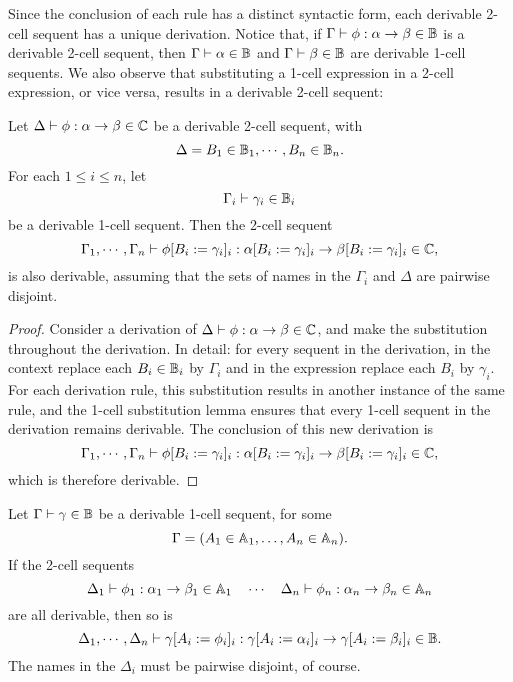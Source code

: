 \documentclass{robinthesisdraft}
\begin{document}
Since the conclusion of each rule has a distinct syntactic form, each derivable
2-cell sequent has a unique derivation.
Notice that, if $\Gamma\vdash \phi:\alpha\to\beta\in\mathbb{B}$ is a derivable
2-cell sequent, then $\Gamma\vdash\alpha\in\mathbb{B}$ and $\Gamma\vdash\beta\in\mathbb{B}$
are derivable 1-cell sequents.
%
We also observe that substituting a 1-cell expression in a 2-cell expression,
or vice versa, results in a derivable 2-cell sequent:
\begin{lemma}[1-in-2 substitution]\label{lemma-1in2}
	Let \( \Delta \vdash \phi:\alpha\to\beta \in\mathbb{C} \)
	be a derivable 2-cell sequent, with
	\[
		\Delta = B_{1}\in\mathbb{B}_{1}, \cdots, B_{n}\in\mathbb{B}_{n}.
	\]
	For each $1\leq i\leq n$, let
	\[
		\Gamma_{i} \vdash \gamma_{i}\in\mathbb{B}_{i}
	\]
	be a derivable 1-cell sequent. Then the 2-cell sequent
	\[ \Gamma_{1}, \cdots, \Gamma_{n}
		\vdash \phi[B_{i}:=\gamma_{i}]_{i}
		: \alpha[B_{i}:=\gamma_{i}]_{i}\to\beta[B_{i}:=\gamma_{i}]_{i}
		\in \mathbb{C}, \]
	is also derivable,
	assuming that the sets of names in the $\Gamma_{i}$ and $\Delta$
	are pairwise disjoint.
\end{lemma}
\begin{proof}
	Consider a derivation of \( \Delta \vdash \phi:\alpha\to\beta \in\mathbb{C} \),
	and make the substitution throughout the derivation. In detail: for
	every sequent in the derivation, in the context replace each $B_{i}\in\mathbb{B}_{i}$
	by $\Gamma_{i}$ and in the expression replace each $B_{i}$ by $\gamma_{i}$.
	For each derivation rule, this
	substitution results in another instance of the same rule, and the
	1-cell substitution lemma ensures that every 1-cell sequent in the
	derivation remains derivable. The conclusion of this new derivation
	is
	\[ \Gamma_{1}, \cdots, \Gamma_{n}
		\vdash \phi[B_{i}:=\gamma_{i}]_{i}
		: \alpha[B_{i}:=\gamma_{i}]_{i}\to\beta[B_{i}:=\gamma_{i}]_{i}
		\in \mathbb{C}, \]
	which is therefore derivable.
\end{proof}
\begin{lemma}[2-in-1 substitution]\label{lemma-2in1}
	Let $\Gamma\vdash\gamma\in\mathbb{B}$ be a derivable 1-cell sequent, for
	some \[ \Gamma = (A_{1}\in\mathbb{A}_{1},\dots, A_{n}\in\mathbb{A}_{n}). \]
	If the 2-cell sequents
	\[
	\Delta_{1}\vdash \phi_{1} : \alpha_{1}\to\beta_{1} \in \mathbb{A}_{1}
	\quad \cdots \quad
	\Delta_{n}\vdash \phi_{n} : \alpha_{n}\to\beta_{n} \in \mathbb{A}_{n}
	\]
	are all derivable, then so is
	\[
	\Delta_{1},\cdots,\Delta_{n}\vdash \gamma[A_{i} := \phi_{i}]_{i}
		: \gamma[A_{i} := \alpha_{i}]_{i} \to \gamma[A_{i} := \beta_{i}]_{i}
		\in\mathbb{B}.
	\]
	The names in the $\Delta_{i}$ must be pairwise disjoint, of course.
\end{lemma}
\end{document}
